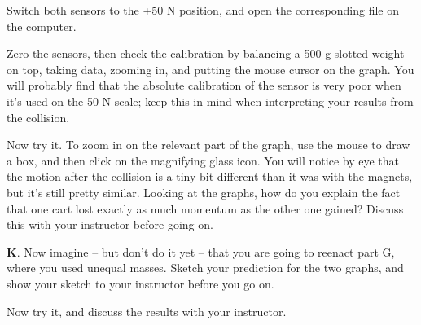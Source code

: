 Switch both sensors to the +50 N position, and open the corresponding file on the computer.

Zero the sensors, then check the calibration by balancing a 500 g slotted weight on top, taking data,
zooming in, and putting the mouse cursor on the graph. You will probably find that the absolute calibration
of the sensor is very poor when it's used on the 50 N scale; keep this in mind when interpreting your results
from the collision.

Now try it. To zoom in on the relevant part of the graph, use the mouse to draw a box, and then click on the
magnifying glass icon. You will notice by eye that the motion after the collision is a tiny bit different than it was
 with the magnets, but it's still pretty similar. Looking at the graphs, how do you explain the fact
 that one cart lost exactly as much momentum as the other one gained? Discuss this with your instructor before going on.

{\textbf K.} Now imagine -- but don't do it yet -- that you are going to reenact part G, where
you used unequal masses. Sketch your
 prediction for the two graphs, and show your sketch to your instructor before you go on.





Now try it, and discuss the results with your instructor.
